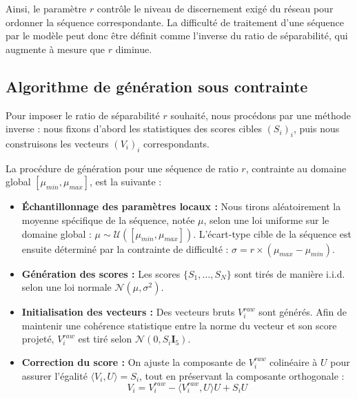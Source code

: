 Ainsi, le paramètre $r$ contrôle le niveau de discernement exigé du réseau pour ordonner la séquence correspondante. La difficulté de traitement d'une séquence par le modèle peut donc être définit comme l'inverse du ratio de séparabilité, qui augmente à mesure que $r$ diminue.

\subsection{Algorithme de génération sous contrainte}
\label{seq:algocontr}
Pour imposer le ratio de séparabilité $r$ souhaité, nous procédons par une méthode inverse : nous fixons d'abord les statistiques des scores cibles $(S_i)_i$, puis nous construisons les vecteurs $(V_i)_i$ correspondants.

La procédure de génération pour une séquence de ratio $r$, contrainte au domaine global $[\mu_{min}, \mu_{max}]$, est la suivante :

\begin{itemize}
    \item \textbf{Échantillonnage des paramètres locaux :} Nous tirons aléatoirement la moyenne spécifique de la séquence, notée $\mu$, selon une loi uniforme sur le domaine global : $\mu \sim \mathcal{U}([\mu_{min}, \mu_{max}])$. L'écart-type cible de la séquence est ensuite déterminé par la contrainte de difficulté : $\sigma = r \times (\mu_{max} - \mu_{min})$.
    
    \item \textbf{Génération des scores :} Les scores $\{S_1, \dots, S_N\}$ sont tirés de manière i.i.d. selon une loi normale $\mathcal{N}(\mu, \sigma^2)$.
    
    \item \textbf{Initialisation des vecteurs :} Des vecteurs bruts $V^{raw}_i$ sont générés. Afin de maintenir une cohérence statistique entre la norme du vecteur et son score projeté, $V^{raw}_i$ est tiré selon $\mathcal{N}(0, S_i \mathbf{I}_5)$.
    
    \item \textbf{Correction du score :} On ajuste la composante de $V^{raw}_i$ colinéaire à $U$ pour assurer l'égalité  $\langle V_i, U \rangle = S_i$, tout en préservant la composante orthogonale :
    \begin{equation}
        \label{eq:projection}
        V_i = V^{raw}_i - \langle V^{raw}_i, U \rangle U + S_i U
    \end{equation}
\end{itemize}

